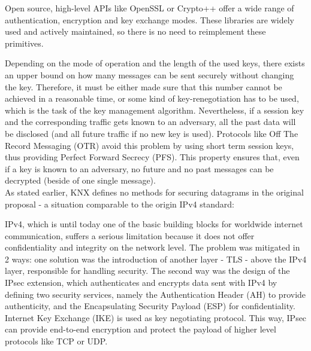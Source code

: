 \documentclass[a4paper,11pt,oneside]{memoir}
\begin{document}
Open source, high-level APIs like OpenSSL or Crypto++ offer a wide range of authentication, encryption and key exchange modes.
These libraries are widely used and actively maintained, so there is no need to reimplement these primitives.

Depending on the mode of operation and the length of the used keys, there exists an upper bound on
 how many messages can be sent securely without changing the key. Therefore, it must be either made sure that this number 
 cannot be achieved in a reasonable time, or some kind of key-renegotiation has to be used, which is the task of the key management algorithm.
 Nevertheless, if a session key and the corresponding traffic gets known to an adversary, all the past data will be disclosed (and all future traffic
 if no new key is used). Protocols like Off The Record Messaging (OTR) \cite{Borisov:2004:OCW:1029179.1029200} avoid this problem by using short term session keys,
 thus providing Perfect Forward Secrecy (PFS). This property ensures that, even if a key is known to an adversary, no future and no past messages can be decrypted (beside of
 one single message).
\\

As stated earlier, KNX defines no methods for securing datagrams in the original proposal - a situation comparable to the origin IPv4 \cite{rfc791} standard:

IPv4, which is until today one of the basic building blocks for worldwide internet communication, suffers a serious limitation because it
does not offer confidentiality and integrity on the network level. The problem was mitigated in 2 ways: one solution was 
the introduction of another layer - TLS -  above the IPv4 layer, responsible for handling security.
The second way was the design of the IPsec \cite{rfc4301} 
extension, which authenticates and encrypts data sent with IPv4 by defining two security services,
namely the Authentication Header (AH) to provide authenticity, and the Encapsulating Security Payload (ESP) for confidentiality. Internet
Key Exchange (IKE) is used as key negotiating protocol. This way,
IPsec can provide end-to-end encryption and protect the payload of higher level protocols like TCP or UDP.
\end{document}
